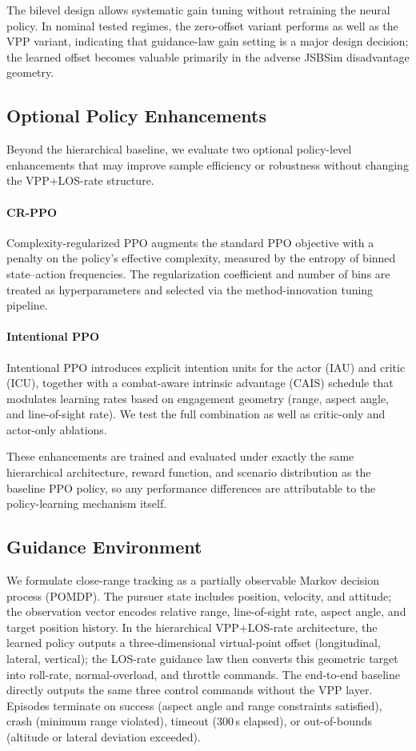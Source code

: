 \documentclass[conference]{IEEEtran}
\begin{document}
The bilevel design allows systematic gain tuning without retraining the neural policy. In nominal tested regimes, the zero-offset variant performs as well as the VPP variant, indicating that guidance-law gain setting is a major design decision; the learned offset becomes valuable primarily in the adverse JSBSim disadvantage geometry.

\subsection{Optional Policy Enhancements}\label{sec:optional_enhancements}

Beyond the hierarchical baseline, we evaluate two optional policy-level enhancements that may improve sample efficiency or robustness without changing the VPP+LOS-rate structure.

\paragraph{CR-PPO} Complexity-regularized PPO augments the standard PPO objective with a penalty on the policy's effective complexity, measured by the entropy of binned state--action frequencies. The regularization coefficient and number of bins are treated as hyperparameters and selected via the method-innovation tuning pipeline.

\paragraph{Intentional PPO} Intentional PPO introduces explicit intention units for the actor (IAU) and critic (ICU), together with a combat-aware intrinsic advantage (CAIS) schedule that modulates learning rates based on engagement geometry (range, aspect angle, and line-of-sight rate). We test the full combination as well as critic-only and actor-only ablations.

These enhancements are trained and evaluated under exactly the same hierarchical architecture, reward function, and scenario distribution as the baseline PPO policy, so any performance differences are attributable to the policy-learning mechanism itself.

\subsection{Guidance Environment}\label{sec:guidance_env}

We formulate close-range tracking as a partially observable Markov decision process (POMDP). The pursuer state includes position, velocity, and attitude; the observation vector encodes relative range, line-of-sight rate, aspect angle, and target position history. In the hierarchical VPP+LOS-rate architecture, the learned policy outputs a three-dimensional virtual-point offset (longitudinal, lateral, vertical); the LOS-rate guidance law then converts this geometric target into roll-rate, normal-overload, and throttle commands. The end-to-end baseline directly outputs the same three control commands without the VPP layer. Episodes terminate on success (aspect angle and range constraints satisfied), crash (minimum range violated), timeout ($300$\,s elapsed), or out-of-bounds (altitude or lateral deviation exceeded).
\end{document}
